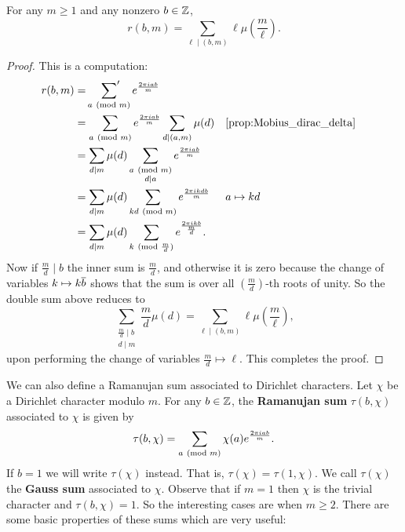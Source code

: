       \begin{proposition}\label{prop:Ramanujan_sum_evaluation}
        For any $m \ge 1$ and any nonzero $b \in \mathbb{Z}$,
        \[
          r(b,m) = \sum_{\ell \mid (b,m)}\ell\mu\left(\frac{m}{\ell}\right).
        \]
      \end{proposition}
      \begin{proof}
        This is a computation:
        \begin{align*}
          r(b,m) &= \psum_{a \tmod{m}}e^{\frac{2\pi iab}{m}} \\
          &= \sum_{a \tmod{m}}e^{\frac{2\pi iab}{m}}\sum_{d \mid (a,m)}\mu(d) && \text{\cref{prop:Mobius_dirac_delta}} \\
          &= \sum_{d \mid m}\mu(d)\sum_{\substack{a \tmod{m} \\ d \mid a}}e^{\frac{2\pi iab}{m}} \\
          &= \sum_{d \mid m}\mu(d)\sum_{kd \tmod{m}}e^{\frac{2\pi ikdb}{m}} && \text{$a \mapsto kd$} \\
          &= \sum_{d \mid m}\mu(d)\sum_{k \tmod{\frac{m}{d}}}e^{\frac{2\pi ik b}{\frac{m}{d}}}.
        \end{align*}
        Now if $\frac{m}{d} \mid b$ the inner sum is $\frac{m}{d}$, and otherwise it is zero because the change of variables $k \mapsto k\overline{b}$ shows that the sum is over all $\left(\frac{m}{d}\right)$-th roots of unity. So the double sum above reduces to
        \[
          \sum_{\substack{\frac{m}{d} \mid b \\ d \mid m}}\frac{m}{d}\mu(d) = \sum_{\ell \mid (b,m)}\ell\mu\left(\frac{m}{\ell}\right),
        \]
        upon performing the change of variables $\frac{m}{d} \mapsto \ell$. This completes the proof.
      \end{proof}
      We can also define a Ramanujan sum associated to Dirichlet characters. Let $\chi$ be a Dirichlet character modulo $m$. For any $b \in \mathbb{Z}$, the \textbf{Ramanujan sum} $\tau(b,\chi)$ associated to $\chi$ is given by
      \[
        \tau(b,\chi) = \sum_{a \ (\mathrm{mod}\text{ }m)}\chi(a)e^{\frac{2\pi iab}{m}}.
      \]
      If $b = 1$ we will write $\tau(\chi)$ instead. That is, $\tau(\chi) = \tau(1,\chi)$. We call $\tau(\chi)$ the \textbf{Gauss sum} associated to $\chi$. Observe that if $m = 1$ then $\chi$ is the trivial character and $\tau(b,\chi) = 1$. So the interesting cases are when $m \ge 2$. There are some basic properties of these sums which are very useful:

